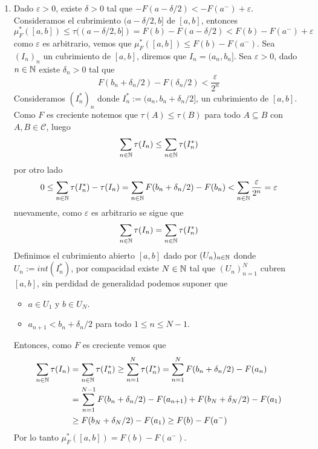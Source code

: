 \documentclass{article}
\begin{document}
\begin{enumerate}
    \item Dado $\varepsilon>0$, existe $\delta>0$ tal que $-F(a-\delta/2)<-F(a^{-})+\varepsilon$.
    Consideramos el cubrimiento $(a-\delta/2,b]$ de $[a,b]$, entonces
    \begin{equation*}
        \mu_{F}^{*}([a,b])\leq\tau((a-\delta/2,b])=F(b)-F(a-\delta/2)<F(b)-F(a^{-})+\varepsilon
    \end{equation*}
    como $\varepsilon$ es arbitrario, vemos que $\mu_{F}^{*}([a,b])\leq F(b)-F(a^{-})$. Sea 
    $(I_{n})_{n}$ un cubrimiento de $[a,b]$, diremos que $I_{n}=(a_{n},b_{n}]$. Sea 
    $\varepsilon>0$, dado $n\in\mathbb{N}$ existe $\delta_{n}>0$ tal que
    \begin{equation*}
        F(b_{n}+\delta_{n}/2)-F(\delta_{n}/2)<\frac{\varepsilon}{2^{n}}
    \end{equation*}
    Consideramos $(I_{n}^{*})_{n}$ donde $I_{n}^{*}:=(a_{n},b_{n}+\delta_{n}/2]$, un cubrimiento de
    $[a,b]$. Como $F$ es creciente notemos que $\tau(A)\leq\tau(B)$ para todo $A\subseteq B$ con 
    $A,B\in\mathcal{C}$, luego
    \begin{equation*}
        \sum_{n\in\mathbb{N}}\tau(I_{n})\leq\sum_{n\in\mathbb{N}}\tau(I_{n}^{*})
    \end{equation*}
    por otro lado
    \begin{equation*}
        0\leq\sum_{n\in\mathbb{N}}\tau(I_{n}^{*})-\tau(I_{n})=\sum_{n\in\mathbb{N}}F(b_{n}+{\delta_{n}/2})
        -F(b_{n})<\sum_{n\in\mathbb{N}}\frac{\varepsilon}{2^{n}}=\varepsilon
    \end{equation*}
    nuevamente, como $\varepsilon$ es arbitrario se sigue que
    \begin{equation*}
        \sum_{n\in\mathbb{N}}\tau(I_{n})=\sum_{n\in\mathbb{N}}\tau(I_{n}^{*})
    \end{equation*}
    Definimos el cubrimiento abierto $[a,b]$ dado por $(U_{n})_{n\in\mathbb{N}}$ donde 
    $U_{n}:=int(I_{n}^{*})$, por compacidad existe $N\in\mathbb{N}$ tal que $(U_{n})_{n=1}^{N}$ 
    cubren $[a,b]$, sin perdidad de generalidad podemos suponer que
    \begin{itemize}
        \item $a\in U_{1}$ y $b\in U_{N}$.
        \item $a_{n+1}<b_{n}+\delta_{n}/2$ para todo $1\leq n\leq N-1$.
    \end{itemize}
    Entonces, como $F$ es creciente vemos que
    \begin{align*}
        \sum_{n\in\mathbb{N}}\tau(I_{n}) &= \sum_{n\in\mathbb{N}}\tau(I_{n}^{*})\geq
        \sum_{n=1}^{N}\tau(I_{n}^{*})=\sum_{n=1}^{N}F(b_{n}+\delta_{n}/2)-F(a_{n}) \\
        &= \sum_{n=1}^{N-1}F(b_{n}+\delta_{n}/2)-F(a_{n+1})+F(b_{N}+\delta_{N}/2)-F(a_{1}) \\
        &\geq F(b_{N}+\delta_{N}/2)-F(a_{1})\geq F(b)-F(a^{-})
    \end{align*}
    Por lo tanto $\mu_{F}^{*}([a,b])=F(b)-F(a^{-})$.
    

\end{enumerate}
\end{document}
